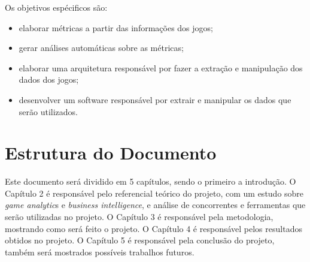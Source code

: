 	Os objetivos espécificos são:
	\begin{itemize}
		\item elaborar métricas a partir das informações dos jogos;
		\item gerar análises automáticas sobre as métricas;
		\item elaborar uma arquitetura responsável por fazer a extração e manipulação dos dados dos jogos;
		\item desenvolver um software responsável por extrair e manipular os dados que serão utilizados.
	\end{itemize}
\section{Estrutura do Documento}
Este documento será dividido em 5 capítulos, sendo o primeiro a introdução. O Capítulo 2 é responsável pelo referencial teórico do projeto, com um estudo sobre \textit{game analytic}s e \textit{business intelligence}, e análise de concorrentes e ferramentas que serão utilizadas no projeto. O Capítulo 3 é responsável pela metodologia, mostrando como será feito o projeto. O Capítulo 4 é responsável pelos resultados obtidos no projeto. O Capítulo 5 é responsável pela conclusão do projeto, também será mostrados possíveis trabalhos futuros.